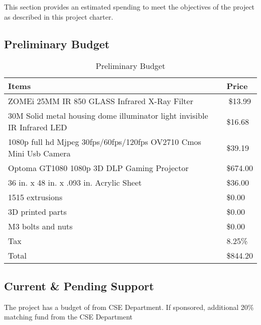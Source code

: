 This section provides an estimated spending to meet the objectives of the project as described in this project charter.
\subsection{Preliminary Budget}
\begin{table}[H]
\centering
\caption{Preliminary Budget}
\label{Budget}
\begin{tabular}{|l|l|}
\hline
Items                                                                    & Price                        \\ \hline
ZOMEi 25MM IR 850 GLASS Infrared X-Ray Filter                            & \multicolumn{1}{c|}{\$13.99} \\ \hline
30M Solid metal housing dome illuminator light invisible IR Infrared LED & \$16.68                      \\ \hline
1080p full hd Mjpeg 30fps/60fps/120fps OV2710 Cmos Mini Usb Camera       & \$39.19                      \\ \hline
Optoma GT1080 1080p 3D DLP Gaming Projector                              & \$674.00                     \\ \hline
36 in. x 48 in. x .093 in. Acrylic Sheet                                 & \$36.00                      \\ \hline
1515 extrusions                                                          & \$0.00                       \\ \hline
3D printed parts                                                         & \$0.00                       \\ \hline
M3 bolts and nuts                                                        & \$0.00                       \\ \hline
Tax                                                                      & 8.25\%                       \\ \hline
Total                                                                    & \$844.20                     \\ \hline
\end{tabular}
\end{table}

\subsection{Current \& Pending Support}
The project has a budget of  from CSE Department. \newline
If sponsored, additional 20\% matching fund from the CSE Department
